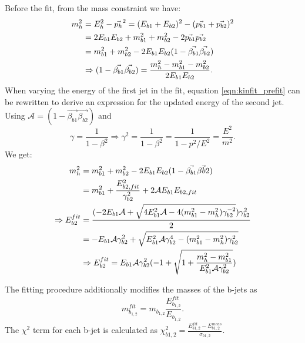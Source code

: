 Before the fit, from the mass constraint we have:
~\vspace{-0.5\baselineskip}
\begin{align}\label{eqn:kinfit_prefit}
m_{h}^2 &= E_{h}^2 - \vec{p_{h}}^2 = (E_{b1}+E_{b2})^2 - (\vec{p_{b1}} + \vec{p_{b2}})^2 \notag\\
& = 2E_{b1}E_{b2} + m_{b1}^2 +m_{b2}^2 - 2\vec{p_{b1}}\vec{p_{b2}} \notag\\
& = m_{b1}^2 +m_{b2}^2 - 2E_{b1}E_{b2}(1-\vec{\beta_{b1}}\vec{\beta_{b2}})\notag\\
&\Rightarrow (1-\vec{\beta_{b1}}\vec{\beta_{b2}}) = \frac{m_h^2 - m_{b1}^2 - m_{b2}^2}{2E_{b1}E_{b2}}.
\end{align}
When varying the energy of the first jet in the fit, equation \ref{eqn:kinfit_prefit} can be 
rewritten to derive an expression for the updated energy of the second jet. Using $\mathcal{A} = (1-\vec{\beta_{b1}}\vec{\beta_{b2}})$ 
and
~\vspace{-0.5\baselineskip}
\begin{equation}\label{eqn:gamma_def}
\gamma = \frac{1}{1-\beta^2} \Rightarrow \gamma^2 = \frac{1}{1-\beta^2} = \frac{1}{1-p^2/E^2} = \frac{E^2}{m^2}.
\end{equation}
We get:
~\vspace{-0.5\baselineskip}
\begin{align}\label{eqn:kinfit_variation}
m_h^2 &= m_{b1}^2 + m_{b2}^2 - 2E_{b1}E_{b2}(1-\vec{\beta_{b1}}\vec{\beta{b2}})\notag\\
&= m_{b1}^2 +\frac{E_{b2,fit}^2}{\gamma_{b2}^2} +2\mathcal{A}E_{b1}E_{b2,fit}\notag\\
\Rightarrow E_{b2}^{fit}& = \frac{(-2E_{b1}\mathcal{A} + \sqrt{4E_{b1}^2\mathcal{A} - 4(m_{b1}^2-m_{h}^2)\gamma_{b2}^{-2}})\gamma_{b2}^2}{2}\notag\\
&= - E_{b1}\mathcal{A}\gamma_{b2}^2+\sqrt{E_{b1}^2\mathcal{A}\gamma_{b2}^4 - (m_{b1}^2 - m_{h}^2)\gamma_{b2}^2}\notag\\
&\Rightarrow E_{b2}^{fit} = E_{b1}\mathcal{A}\gamma_{b2}^2(-1 + \sqrt{1+\frac{m_{h}^2 - m_{b1}^2}{E_{b1}^2\mathcal{A}\gamma_{b2}^2}})
\end{align}

The fitting procedure additionally modifies the masses of the b-jets as 
~\vspace{-0.5\baselineskip}
\begin{equation}\label{eqn:kinfit_bjetmass}
m_{b_{1,2}}^{fit} = m_{b_{1,2}}\frac{E_{b_{1,2}}^{fit}}{E_{b_{1,2}}}.
\end{equation}
The $\chi^2$ term for each b-jet is calculated as $\chi_{b1,2}^2 = \frac{E_{b1,2}^{fit}-E_{b1,2}^{meas}}{\sigma_{b1,2}}$.

